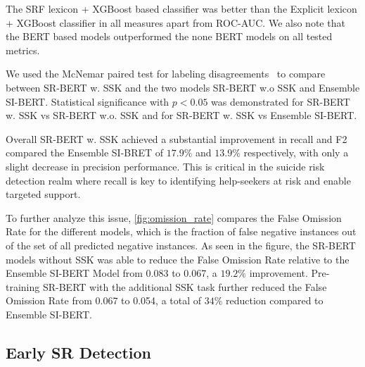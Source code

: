 \documentclass[letterpaper]{article} %
\begin{document}
The SRF lexicon + XGBoost based classifier was better than the Explicit lexicon + XGBoost classifier in all measures apart from ROC-AUC. 
We also note that the BERT based models outperformed the none BERT models on all tested metrics.  

We used the  McNemar paired test for labeling disagreements~\cite{gllick} to compare between SR-BERT w. SSK and the two models SR-BERT w.o SSK and Ensemble SI-BERT. Statistical significance with $p < 0.05$ was demonstrated for SR-BERT w. SSK vs SR-BERT w.o. SSK and for SR-BERT w. SSK vs Ensemble SI-BERT.


Overall SR-BERT w. SSK achieved a substantial improvement in recall and F2 compared the Ensemble SI-BRET of $17.9\%$ and $13.9\%$  respectively, with only a slight decrease in precision performance. This is critical in the suicide risk detection realm where recall is key to identifying help-seekers at risk and enable targeted support. 

To further analyze this issue,  \autoref{fig:omission_rate} compares the False Omission Rate for the different models, which is the fraction of false negative instances out of the set of all predicted negative instances.
%
As seen in the figure, the SR-BERT models without SSK was able to reduce the False Omission Rate relative to the Ensemble SI-BERT Model from 0.083 to 0.067, a $19.2\%$ improvement. Pre-training SR-BERT with the additional SSK task further reduced the False Omission Rate from  0.067 to 0.054, a total of $34\%$ reduction compared to Ensemble SI-BERT.
 
\subsection{Early SR Detection}
\end{document}

